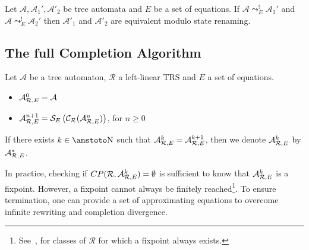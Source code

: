 \documentclass[a4paper,11pt]{llncs}
\newcommand{\A}{\mathcal{A}}
\def \R {\mathcal{R}}
\newcommand{\simp}{\leadsto}
\newcommand{\nr}{E}
\newcommand{\comp}{{\cal C}}
\def\simpleq#1#2{\mathcal S_{#1}\left(#2\right)}
\newcommand{\aapprox}{{\cal A}_{\R, \nr}}
\newcommand{\NN}{\mbox{\amstoto\char'116}}
\theoremstyle{plain}
\begin{document}
\begin{theorem}
  \label{theorem:canonical}
  Let $\A,\A_1', \A'_2$ be tree automata and $E$ be a set of 
  equations. If $\A \simp_E^! \A_1'$ and $\A \simp_E^! \A_2'$ then
$\A'_1$ and $\A'_2$ are equivalent modulo state renaming.
\end{theorem}




\subsection{The full Completion Algorithm}
\label{sec:completion}

\begin{definition}
\label{def:completion}
Let $\A$ be a tree automaton, $\R$ a left-linear TRS and $E$ a set of equations. 
\begin{itemize}
\item $\aapprox^0= \A$
\item $\aapprox^{n+1}= \simpleq E {\comp_{\R}(\aapprox^n)}$, for $n \geq 0$
\end{itemize}
If there exists $k \in \NN$ such that $\aapprox^{k}=\aapprox^{k+1}$, then we
denote $\aapprox^k$ by $\aapprox^*$.
\end{definition}
In practice, checking if $CP(\R,\aapprox^k)=\emptyset$ is sufficient to know
that $\aapprox^k$ is a fixpoint. However, a fixpoint cannot always be finitely
reached\footnote{See~\cite{Genet-Habil}, for classes of $\R$ for which a
  fixpoint always exists.}. To ensure termination, one can provide a set of
approximating equations to overcome infinite rewriting and 
completion divergence. 
\end{document}
